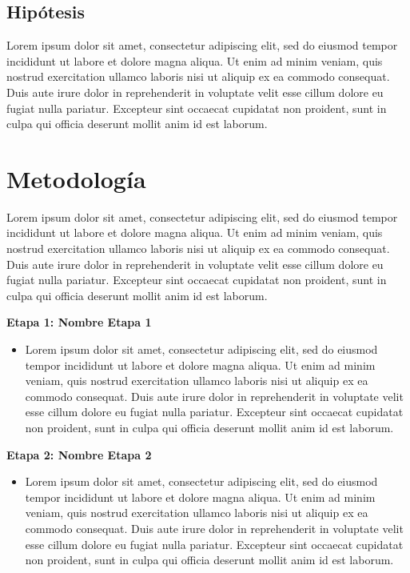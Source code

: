 \documentclass[11pt]{report} %
\begin{document}
\section{Hipótesis}

Lorem ipsum dolor sit amet, consectetur adipiscing elit, sed do eiusmod tempor incididunt ut labore et dolore magna aliqua. Ut enim ad minim veniam, quis nostrud exercitation ullamco laboris nisi ut aliquip ex ea commodo consequat. Duis aute irure dolor in reprehenderit in voluptate velit esse cillum dolore eu fugiat nulla pariatur. Excepteur sint occaecat cupidatat non proident, sunt in culpa qui officia deserunt mollit anim id est laborum.


\chapter{Metodología}

Lorem ipsum dolor sit amet, consectetur adipiscing elit, sed do eiusmod tempor incididunt ut labore et dolore magna aliqua. Ut enim ad minim veniam, quis nostrud exercitation ullamco laboris nisi ut aliquip ex ea commodo consequat. Duis aute irure dolor in reprehenderit in voluptate velit esse cillum dolore eu fugiat nulla pariatur. Excepteur sint occaecat cupidatat non proident, sunt in culpa qui officia deserunt mollit anim id est laborum.

\textbf{Etapa 1: Nombre Etapa 1}

\begin{itemize}

\item Lorem ipsum dolor sit amet, consectetur adipiscing elit, sed do eiusmod tempor incididunt ut labore et dolore magna aliqua. Ut enim ad minim veniam, quis nostrud exercitation ullamco laboris nisi ut aliquip ex ea commodo consequat. Duis aute irure dolor in reprehenderit in voluptate velit esse cillum dolore eu fugiat nulla pariatur. Excepteur sint occaecat cupidatat non proident, sunt in culpa qui officia deserunt mollit anim id est laborum.

\end{itemize}

\textbf{Etapa 2: Nombre Etapa 2}

\begin{itemize}

\item Lorem ipsum dolor sit amet, consectetur adipiscing elit, sed do eiusmod tempor incididunt ut labore et dolore magna aliqua. Ut enim ad minim veniam, quis nostrud exercitation ullamco laboris nisi ut aliquip ex ea commodo consequat. Duis aute irure dolor in reprehenderit in voluptate velit esse cillum dolore eu fugiat nulla pariatur. Excepteur sint occaecat cupidatat non proident, sunt in culpa qui officia deserunt mollit anim id est laborum.

\end{itemize}
\end{document}
